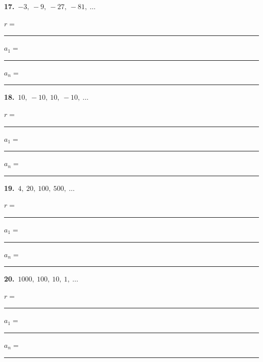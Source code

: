 \documentclass[11pt,letterpaper]{article}
\begin{document}
\needspace{2.3cm}\par\vspace{3mm}\noindent\begin{minipage}[t]{0.48\linewidth}{\color{fmturn}\bfseries 17.}\ $-3,\ -9,\ -27,\ -81,\ \ldots$\par\vspace{2mm}\hspace*{4mm}$r=$\,\rule{1.2cm}{0.4pt}\par\vspace{2.5mm}\hspace*{4mm}$a_1=$\,\rule{1.4cm}{0.4pt}\quad $a_n=$\,\rule{2.6cm}{0.4pt}\end{minipage}\hfill\begin{minipage}[t]{0.48\linewidth}{\color{fmturn}\bfseries 18.}\ $10,\ -10,\ 10,\ -10,\ \ldots$\par\vspace{2mm}\hspace*{4mm}$r=$\,\rule{1.2cm}{0.4pt}\par\vspace{2.5mm}\hspace*{4mm}$a_1=$\,\rule{1.4cm}{0.4pt}\quad $a_n=$\,\rule{2.6cm}{0.4pt}\end{minipage}\par\vspace{1.3cm}
\needspace{2.3cm}\par\vspace{3mm}\noindent\begin{minipage}[t]{0.48\linewidth}{\color{fmturn}\bfseries 19.}\ $4,\ 20,\ 100,\ 500,\ \ldots$\par\vspace{2mm}\hspace*{4mm}$r=$\,\rule{1.2cm}{0.4pt}\par\vspace{2.5mm}\hspace*{4mm}$a_1=$\,\rule{1.4cm}{0.4pt}\quad $a_n=$\,\rule{2.6cm}{0.4pt}\end{minipage}\hfill\begin{minipage}[t]{0.48\linewidth}{\color{fmturn}\bfseries 20.}\ $1000,\ 100,\ 10,\ 1,\ \ldots$\par\vspace{2mm}\hspace*{4mm}$r=$\,\rule{1.2cm}{0.4pt}\par\vspace{2.5mm}\hspace*{4mm}$a_1=$\,\rule{1.4cm}{0.4pt}\quad $a_n=$\,\rule{2.6cm}{0.4pt}\end{minipage}\par\vspace{1.3cm}
\end{document}
